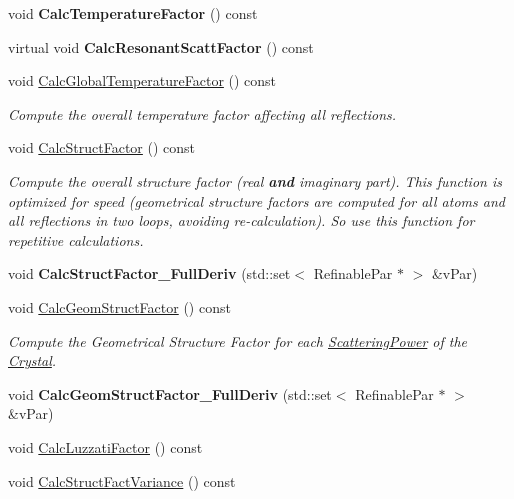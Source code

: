 \begin{DoxyCompactItemize}
void {\bfseries Calc\+Temperature\+Factor} () const
\item 
\mbox{\label{class_obj_cryst_1_1_scattering_data_a8d2f1b1c1c07ab7d7516443c8bf85b5a}} 
virtual void {\bfseries Calc\+Resonant\+Scatt\+Factor} () const
\item 
\mbox{\label{class_obj_cryst_1_1_scattering_data_a7806bd73e3405c7fa50b12a4722f8700}} 
void \mbox{\hyperlink{class_obj_cryst_1_1_scattering_data_a7806bd73e3405c7fa50b12a4722f8700}{Calc\+Global\+Temperature\+Factor}} () const
\begin{DoxyCompactList}\small\item\em Compute the overall temperature factor affecting all reflections. \end{DoxyCompactList}\item 
void \mbox{\hyperlink{class_obj_cryst_1_1_scattering_data_aaf82b283529262aa6b0ec547e23c6b6d}{Calc\+Struct\+Factor}} () const
\begin{DoxyCompactList}\small\item\em Compute the overall structure factor (real {\bfseries{and}} imaginary part). This function is {\itshape optimized} {\itshape for} {\itshape speed} (geometrical structure factors are computed for all atoms and all reflections in two loops, avoiding re-\/calculation). So use this function for repetitive calculations. \end{DoxyCompactList}\item 
\mbox{\label{class_obj_cryst_1_1_scattering_data_ad9ac23b71b9cab1b08c342775f2c40fd}} 
void {\bfseries Calc\+Struct\+Factor\+\_\+\+Full\+Deriv} (std\+::set$<$ Refinable\+Par $\ast$ $>$ \&v\+Par)
\item 
void \mbox{\hyperlink{class_obj_cryst_1_1_scattering_data_a1b0237b27cf0e5a3fef7dba65113504e}{Calc\+Geom\+Struct\+Factor}} () const
\begin{DoxyCompactList}\small\item\em Compute the \textquotesingle{}Geometrical Structure Factor\textquotesingle{} for each \mbox{\hyperlink{class_obj_cryst_1_1_scattering_power}{Scattering\+Power}} of the \mbox{\hyperlink{class_obj_cryst_1_1_crystal}{Crystal}}. \end{DoxyCompactList}\item 
\mbox{\label{class_obj_cryst_1_1_scattering_data_ad3c30b4f623e06e8a9be01fee8e687f0}} 
void {\bfseries Calc\+Geom\+Struct\+Factor\+\_\+\+Full\+Deriv} (std\+::set$<$ Refinable\+Par $\ast$ $>$ \&v\+Par)
\item 
void \mbox{\hyperlink{class_obj_cryst_1_1_scattering_data_a40e555c0ab59f92fda10dbe10cdee91b}{Calc\+Luzzati\+Factor}} () const
\item 
void \mbox{\hyperlink{class_obj_cryst_1_1_scattering_data_a5e2175dbe3023c1f498091006b01a596}{Calc\+Struct\+Fact\+Variance}} () const
\end{DoxyCompactItemize}
